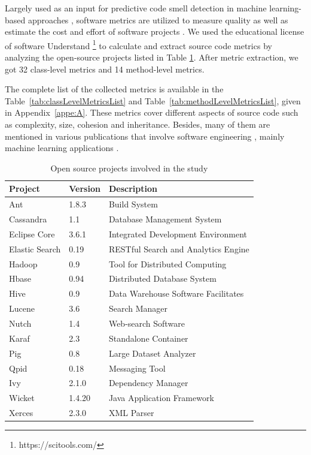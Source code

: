 Largely used as an input for predictive code smell detection in machine learning-based approaches \cite{fontana2016comparing, palomba2018detecting, hozano2017, fontana2013code, azeem2019machine}, software metrics are utilized to measure quality as well as estimate the cost and effort of software projects \cite{fenton2014software}. We used the educational license of software Understand \footnote{https://scitools.com/} to calculate and extract source code metrics by analyzing the open-source projects listed in Table \ref{tbl:openSourceProjects}. After metric extraction, we got 32 class-level metrics and 14 method-level metrics. 

The complete list of the collected metrics is available in the 
Table~\ref{tab:classLevelMetricsList} and Table~\ref{tab:methodLevelMetricsList}, given in Appendix~\ref{appe:A}. These metrics cover different aspects of source code such as complexity, size, cohesion and inheritance. Besides, many of them are mentioned in various publications that involve software engineering \cite{nunez2017source}, mainly machine learning applications \cite{azeem2019machine}.

\begin{table}[t]
\centering
\addtolength{\extrarowheight}{\belowrulesep}
\setlength{\aboverulesep}{0pt}
\setlength{\belowrulesep}{0pt}
\caption{Open source projects involved in the study}
\label{tbl:openSourceProjects}
\begin{tabular}{lll}
\toprule
\rowcolor[rgb]{0.753,0.753,0.753}  \textbf{Project} &   \textbf{Version}    & \textbf{Description}\\ 
\toprule
Ant & 1.8.3 & Build System  \\
Cassandra & 1.1 & Database Management System  \\
Eclipse Core & 3.6.1 & Integrated Development Environment  \\
Elastic Search & 0.19 & RESTful Search and Analytics Engine  \\
Hadoop & 0.9 & Tool for Distributed Computing  \\
Hbase & 0.94 & Distributed Database System  \\
Hive & 0.9 & Data Warehouse Software Facilitates  \\
Lucene & 3.6 & Search Manager  \\
Nutch & 1.4 & Web-search Software  \\
Karaf & 2.3 & Standalone Container  \\
Pig & 0.8 & Large Dataset Analyzer  \\
Qpid & 0.18 & Messaging Tool  \\
Ivy & 2.1.0 & Dependency Manager  \\
Wicket & 1.4.20 & Java Application Framework  \\
Xerces & 2.3.0 & XML Parser  \\
\bottomrule
\end{tabular}
\end{table}


